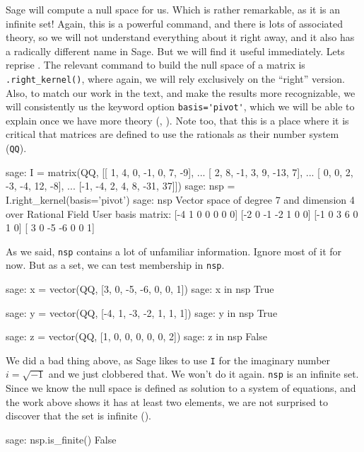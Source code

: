 Sage will compute a null space for us.  Which is rather remarkable, as it is an infinite set!  Again, this is a powerful command, and there is lots of associated theory, so we will not understand everything about it right away, and it also has a radically different name in Sage.  But we will find it useful immediately.  Lets reprise .  The relevant command to build the null space of a matrix is \verb?.right_kernel()?, where again, we will rely exclusively on the ``right'' version.  Also, to match our work in the text, and make the results more recognizable, we will consistently us the keyword option \verb?basis='pivot'?, which we will be able to explain once we have more theory (, ).  Note too, that this is a place where it is critical that matrices are defined to use the rationals as their number system (\verb?QQ?).
%
\begin{sageexample}
sage: I = matrix(QQ, [[ 1,  4,  0, -1,  0,   7, -9],
...                   [ 2,  8, -1,  3,  9, -13,  7],
...                   [ 0,  0,  2, -3, -4,  12, -8],
...                   [-1, -4,  2,  4,  8, -31, 37]])
sage: nsp = I.right_kernel(basis='pivot')
sage: nsp
Vector space of degree 7 and dimension 4 over Rational Field
User basis matrix:
[-4  1  0  0  0  0  0]
[-2  0 -1 -2  1  0  0]
[-1  0  3  6  0  1  0]
[ 3  0 -5 -6  0  0  1]
\end{sageexample}
%
As we said, \verb?nsp? contains a lot of unfamiliar information.  Ignore most of it for now.  But as a set, we can test membership in \verb?nsp?.
%
\begin{sageexample}
sage: x = vector(QQ, [3, 0, -5, -6, 0, 0, 1])
sage: x in nsp
True
\end{sageexample}
%
\begin{sageexample}
sage: y = vector(QQ, [-4, 1, -3, -2, 1, 1, 1])
sage: y in nsp
True
\end{sageexample}
%
\begin{sageexample}
sage: z = vector(QQ, [1, 0, 0, 0, 0, 0, 2])
sage: z in nsp
False
\end{sageexample}
%
We did a bad thing above, as Sage likes to use \verb?I? for the imaginary number $i=\sqrt{-1}$ and we just clobbered that.  We won't do it again.
%
\verb?nsp? is an infinite set.  Since we know the null space is defined as solution to a system of equations, and the work above shows it has at least two elements, we are not surprised to discover that the set is infinite ().
%
\begin{sageexample}
sage: nsp.is_finite()
False
\end{sageexample}
